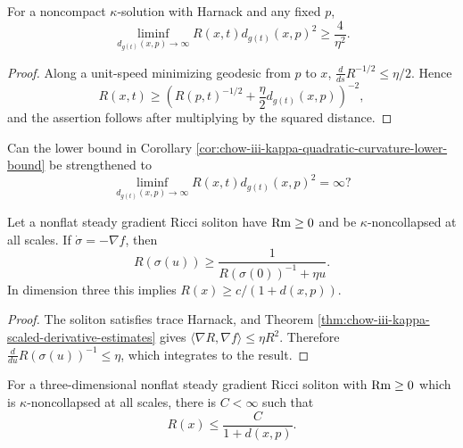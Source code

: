 \begin{corollary}
\label{cor:chow-iii-kappa-quadratic-curvature-lower-bound}
For a noncompact $\kappa$-solution with Harnack and any fixed $p$,
\[
 \liminf_{d_{g(t)}(x,p)\to\infty}R(x,t)d_{g(t)}(x,p)^2
 \ge\frac4{\eta^2}.
\]
\end{corollary}
\begin{proof}
Along a unit-speed minimizing geodesic from $p$ to $x$,
$\frac d{ds}R^{-1/2}\le\eta/2$.  Hence
\[
 R(x,t)\ge
 \left(R(p,t)^{-1/2}+\frac\eta2d_{g(t)}(x,p)\right)^{-2},
\]
and the assertion follows after multiplying by the squared distance.
\end{proof}

\begin{example}
\label{prob:chow-iii-kappa-derivatives-infinite-ascr}
Can the lower bound in Corollary
\ref{cor:chow-iii-kappa-quadratic-curvature-lower-bound} be strengthened to
\[
 \liminf_{d_{g(t)}(x,p)\to\infty}R(x,t)d_{g(t)}(x,p)^2=\infty?
\]
\end{example}

\begin{corollary}
\label{cor:chow-iii-steady-soliton-flowline-curvature-lower-bound}
Let a nonflat steady gradient Ricci soliton have $\operatorname{Rm}\ge0$ and be
$\kappa$-noncollapsed at all scales.  If
$\dot\sigma=-\nabla f$, then
\[
 R(\sigma(u))\ge
 \frac1{R(\sigma(0))^{-1}+\eta u}.
\]
In dimension three this implies $R(x)\ge c/(1+d(x,p))$.
\end{corollary}
\begin{proof}
The soliton satisfies trace Harnack, and Theorem
\ref{thm:chow-iii-kappa-scaled-derivative-estimates} gives
$\langle\nabla R,\nabla f\rangle\le\eta R^2$.  Therefore
$\frac d{du}R(\sigma(u))^{-1}\le\eta$, which integrates to the result.
\end{proof}

\begin{corollary}
\label{cor:chow-iii-3d-steady-soliton-curvature-upper-bound}
For a three-dimensional nonflat steady gradient Ricci soliton with
$\operatorname{Rm}\ge0$ which is $\kappa$-noncollapsed at all scales, there is $C<\infty$
such that
\[
 R(x)\le\frac C{1+d(x,p)}.
\]
\end{corollary}

